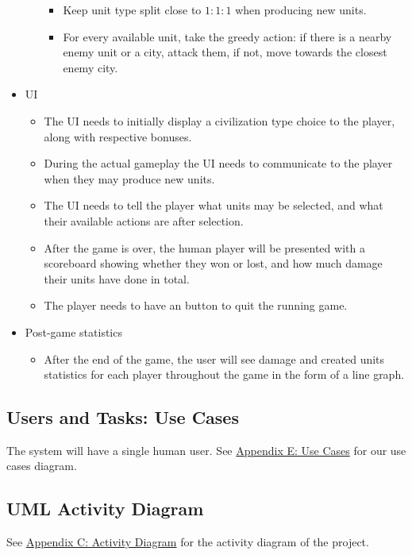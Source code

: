 \documentclass[11pt]{amsart}
\begin{document}
\begin{itemize}
\begin{itemize}
        \begin{itemize}
            \item Keep unit type split close to $1:1:1$ when producing new units.
            \item For every available unit, take the greedy action: if there is a nearby enemy unit or a city, attack them, if not, move towards the closest enemy city.
        \end{itemize}
    \end{itemize}
    \item UI
    \begin{itemize}
        \item The UI needs to initially display a civilization type choice to the player, along with respective bonuses.
        \item During the actual gameplay the UI needs to communicate to the player when they may produce new units.
        \item The UI needs to tell the player what units may be selected, and what their available actions are after selection.
        \item After the game is over, the human player will be presented with a scoreboard showing whether they won or lost, and how much damage their units have done in total.
        \item The player needs to have an button to quit the running game.
    \end{itemize}
    \item Post-game statistics
    \begin{itemize}
        \item After the end of the game, the user will see damage and created units statistics for each player throughout the game in the form of a line graph.
    \end{itemize}
\end{itemize}

\subsection*{Users and Tasks: Use Cases} \phantom{}
The system will have a single human user. See \hyperref[sec:appendixe]{Appendix E: Use Cases} for our use cases diagram.

\subsection*{UML Activity Diagram} \phantom{}
See \hyperref[sec:appendixc]{Appendix C: Activity Diagram} for the activity diagram of the project.
\end{document}
